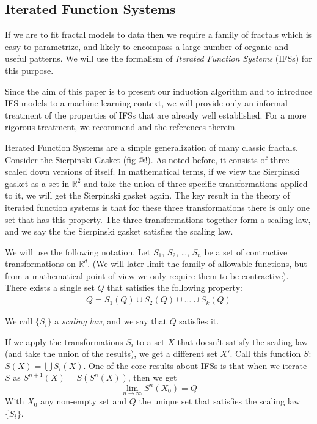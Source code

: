 \documentclass[11pt]{article}
\theoremstyle{definition}
\begin{document}
\subsection{Iterated Function Systems}

If we are to fit fractal models to data then we require a family of fractals which is easy to parametrize, and likely to encompass a large number of organic and useful patterns. We will use the formalism of \emph{Iterated Function Systems} (IFSs) for this purpose. 

Since the aim of this paper is to present our induction algorithm and to introduce IFS models to a machine learning context, we will provide only an informal treatment of the properties of IFSs that are already well established. For a more rigorous treatment, we recommend \cite{hutchinson2000deterministic} and the references therein.

Iterated Function Systems are a simple generalization of many classic fractals. Consider the Sierpinski Gasket (fig @!). As noted before, it consists of three scaled down versions of itself. In mathematical terms, if we view the Sierpinski gasket as a set in ${\mathbb R}^2$ and take the union of three specific transformations applied to it, we will get the Sierpinski gasket again. The key result in the theory of iterated function systems is that for these three transformations there is only one set that has this property. The three transformations together form a scaling law, and we say the the Sierpinski gasket satisfies the scaling law.

We will use the following notation. Let $S_1$, $S_2$, \ldots, $S_n$ be a set of contractive transformations on ${\mathbb R}^d$. (We will later limit the family of allowable functions, but from a mathematical point of view we only require them to be contractive). There exists a single set $Q$ that satisfies the following property:
\begin{align}
Q = S_1(Q) \cup S_2(Q) \cup \ldots \cup S_k(Q) \label{scaling law}
\end{align}

We call $\{S_i\}$ a \textit{scaling law}, and we say that $Q$ satisfies it.
 
If we apply the transformations $S_i$ to a set $X$ that doesn't satisfy the scaling law (and take the union of the results), we get a different set $X'$. Call this function $S$: $S(X) = \bigcup S_i(X)$. One of the core results about IFSs is that when we iterate $S$ as $S^{n+1}(X) = S(S^n(X))$, then we get 
\[
\lim_{n \rightarrow \infty} S^n(X_0) = Q
\]
With $X_0$ any non-empty set and $Q$ the unique set that satisfies the scaling law $\{S_i\}$.
\end{document}
